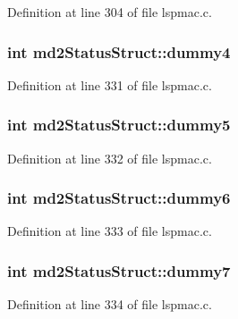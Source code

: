Definition at line 304 of file lspmac.\-c.

\hypertarget{structmd2StatusStruct_adaa01db9cf77d95756bc3156fb702600}{
\subsubsection[{dummy4}]{\setlength{\rightskip}{0pt plus 5cm}int md2\-Status\-Struct\-::dummy4}}\label{structmd2StatusStruct_adaa01db9cf77d95756bc3156fb702600}


Definition at line 331 of file lspmac.\-c.

\hypertarget{structmd2StatusStruct_af4f8869f8954c6162cae80000c54694f}{
\subsubsection[{dummy5}]{\setlength{\rightskip}{0pt plus 5cm}int md2\-Status\-Struct\-::dummy5}}\label{structmd2StatusStruct_af4f8869f8954c6162cae80000c54694f}


Definition at line 332 of file lspmac.\-c.

\hypertarget{structmd2StatusStruct_a864a2234ede061ec2380230ebf29ce70}{
\subsubsection[{dummy6}]{\setlength{\rightskip}{0pt plus 5cm}int md2\-Status\-Struct\-::dummy6}}\label{structmd2StatusStruct_a864a2234ede061ec2380230ebf29ce70}


Definition at line 333 of file lspmac.\-c.

\hypertarget{structmd2StatusStruct_a91f38d814222edeffa67a6a3ab61f5d6}{
\subsubsection[{dummy7}]{\setlength{\rightskip}{0pt plus 5cm}int md2\-Status\-Struct\-::dummy7}}\label{structmd2StatusStruct_a91f38d814222edeffa67a6a3ab61f5d6}


Definition at line 334 of file lspmac.\-c.

